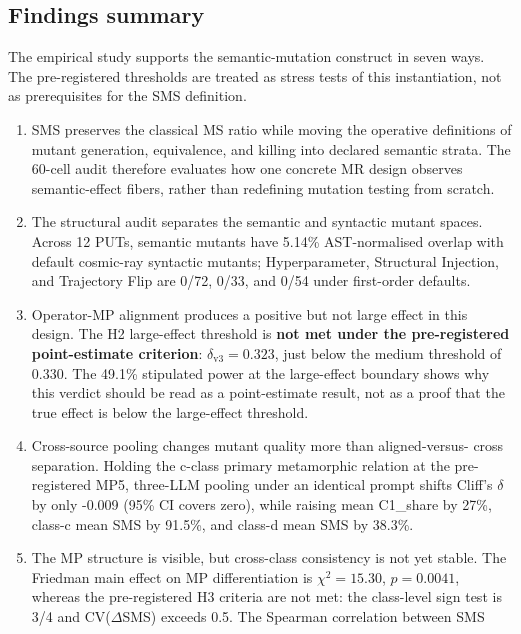\documentclass[manuscript,screen,review]{acmart}
\begin{document}
\subsection{Findings summary}\label{findings-summary}

The empirical study supports the semantic-mutation construct in seven
ways. The pre-registered thresholds are treated as stress tests of this
instantiation, not as prerequisites for the SMS definition.

\begin{enumerate}[label=(\alph*)]
\item
  SMS preserves the classical MS ratio while moving the operative
  definitions of mutant generation, equivalence, and killing into
  declared semantic strata. The 60-cell audit therefore evaluates how
  one concrete MR design observes semantic-effect fibers, rather than
  redefining mutation testing from scratch.
\item
  The structural audit separates the semantic and syntactic mutant
  spaces. Across 12 PUTs, semantic mutants have 5.14\% AST-normalised
  overlap with default cosmic-ray syntactic mutants; Hyperparameter,
  Structural Injection, and Trajectory Flip are 0/72, 0/33, and 0/54
  under first-order defaults.
\item
  Operator-MP alignment produces a positive but not large effect in this
  design. The H2 large-effect threshold is \textbf{not met under the
  pre-registered point-estimate criterion}: \(\delta_{\mathrm{v3}} =
  0.323\), just below the \citet{romano2006cliff} medium threshold of
  0.330. The 49.1\% stipulated power at the large-effect boundary shows
  why this verdict should be read as a point-estimate result, not as a
  proof that the true effect is below the large-effect threshold.
\item
  Cross-source pooling changes mutant quality more than aligned-versus-
  cross separation. Holding the c-class primary metamorphic relation at
  the pre-registered MP5, three-LLM pooling under an identical prompt
  shifts Cliff's \(\delta\) by only -0.009 (95\% CI covers zero), while
  raising mean C1\_share by 27\%, class-c mean SMS by 91.5\%, and
  class-d mean SMS by 38.3\%.
\item
  The MP structure is visible, but cross-class consistency is not yet
  stable. The Friedman main effect on MP differentiation is
  \(\chi^2 = 15.30\), \(p = 0.0041\), whereas the pre-registered H3
  criteria are not met: the class-level sign test is 3/4 and
  CV(\(\Delta\)SMS) exceeds 0.5. The Spearman correlation between SMS

\end{enumerate}
\end{document}
